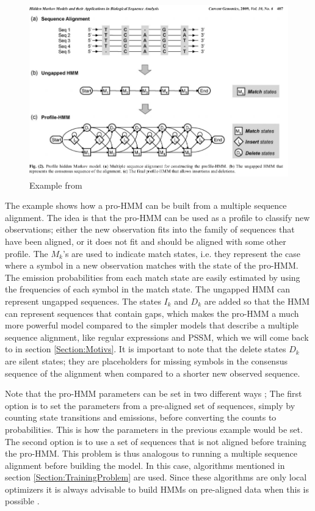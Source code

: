 \documentclass{article}
\begin{document}
\begin{figure}
    \centering
    \includegraphics[width = \textwidth]{exampleProfileHMM.png}
    \caption{Example from \cite{Yoon2009}}
    \label{fig:Yoon2009ProfileHMMExample}
\end{figure}

The example shows how a pro-HMM can be built from a multiple sequence alignment. The idea is that the pro-HMM can be used as a profile to classify new observations; either the new observation fits into the family of sequences that have been aligned, or it does not fit and should be aligned with some other profile. The $M_k$'s are used to indicate match states, i.e. they represent the case where a symbol in a new observation matches with the state of the pro-HMM. The emission probabilities from each match state are easily estimated by using the frequencies of each symbol in the match state. The ungapped HMM can represent ungapped sequences. The states $I_k$ and $D_k$ are added so that the HMM can represent sequences that contain gaps, which makes the pro-HMM a much more powerful model compared to the simpler models that describe a multiple sequence alignment, like regular expressions and PSSM, which we will come back to in section \ref{Section:Motivs}. It is important to note that the delete states $D_k$ are silent states; they are placeholders for missing symbols in the consensus sequence of the alignment when compared to a shorter new observed sequence. 

Note that the pro-HMM parameters can be set in two different ways \cite{Eddy1998}; The first option is to set the parameters from a pre-aligned set of sequences, simply by counting state transitions and emissions, before converting the counts to probabilities. This is how the parameters in the previous example would be set. The second option is to use a set of sequences that is not aligned before training the pro-HMM. This problem is thus analogous to running a multiple sequence alignment before building the model. In this case, algorithms mentioned in section \ref{Section:TrainingProblem} are used. Since these algorithms are only local optimizers it is always advisable to build HMMs on pre-aligned data when this is possible \cite{Eddy1998}. 
\end{document}
